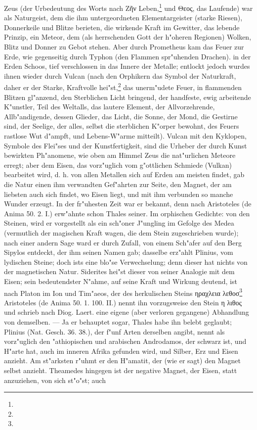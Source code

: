 \documentclass[a4paper, 11pt, oneside, polutonikogreek, german]{article}
\begin{document}
Zeus (der Urbedeutung des Worts nach Ζῆν Leben,\footnote{} und Θεος, das Laufende) war als Naturgeist, dem die ihm untergeordneten Elementargeister (starke Riesen), Donnerkeile und Blitze berieten, die wirkende Kraft im Gewitter, das lebende Prinzip, ein Meteor, dem (als herrschenden Gott der h"oheren Regionen) Wolken, Blitz und Donner zu Gebot stehen. Aber durch Prometheus kam das Feuer zur Erde, wie gegenseitig durch Typhon (den Flammen spr"uhenden Drachen). in der Erden Schoos, tief verschlossen in das Innere der Metalle; entlockt jedoch wurdes ihnen wieder durch Vulcan (nach den Orphikern das Symbol der Naturkraft, daher er der Starke, Kraftvolle hei"st,\footnote{} das unerm"udete Feuer, in flammenden Blitzen gl"anzend, den Sterblichen Licht bringend, der handfeste, ewig arbeitende K"unstler, Teil des Weltalls, das lautere Element, der Allvorzehrende, Allb"andigende, dessen Glieder, das Licht, die Sonne, der Mond, die Gestirne sind, der Seelige, der alles, selbst die sterblichen K"orper bewohnt, des Feuers rastlose Wut d"ampft, und Lebens-W"arme mitteilt). Vulcan mit den Kyklopen, Symbole des Flei"ses und der Kunstfertigkeit, sind die Urheber der durch Kunst bewirkten Ph"anomene, wie oben am Himmel Zeus die nat"urlichen Meteore erregt; aber dem Eisen, das vorz"uglich vom g"ottlichen Schmiede (Vulkan) bearbeitet wird, d. h. von allen Metallen sich auf Erden am meisten findet, gab die Natur einen ihm verwandten Gef"ahrten zur Seite, den Magnet, der am liebsten auch sich findet, wo Eisen liegt, und mit ihm verbunden so manche Wunder erzeugt. In der fr"uhesten Zeit war er bekannt, denn nach Aristoteles (de Anima 50. 2. I.) erw"ahnte schon Thales seiner. Im orphischen Gedichte: von den Steinen, wird er vorgestellt als ein sch"oner J"ungling im Gefolge des Medea (vermutlich der magischen Kraft wagen, die dem Stein zugeschrieben wurde); nach einer andern Sage ward er durch Zufall, von einem Sch"afer auf den Berg Sipylos entdeckt, der ihm seinen Namen gab; dasselbe erz"ahlt Plinius, vom lydischen Steine; doch ists eine blo"se Verwechselung; denn dieser hat nichts von der magnetischen Natur. Siderites hei"st dieser von seiner Analogie mit dem Eisen; sein bedeutendster N"ahme, auf seine Kraft und Wirkung deutend, ist nach Platon im Ion und Tim"aeos, der des herkulischen Steins ηραχλεια λεθοσ\footnote{} Aristoteles (de Anima 50. 1. 100. II.) nennt ihn vorzugsweise den Stein η λιθος und schrieb nach Diog. Laert. eine eigene (aber verloren gegangene) Abhandlung von demselben. --- Ja er behauptet sogar, Thales habe ihn belebt geglaubt; Plinius (Nat. Gesch. 36. 38.), der f"unf Arten derselben angibt, nennt als vorz"uglich den "athiopischen und arabischen Androdamos, der schwarz ist, und H"arte hat, auch im inneren Afrika gefunden wird, und Silber, Erz und Eisen anzieht. Am st"arksten r"uhmt er den H"amatit, der (wie er sagt) den Magnet selbst anzieht. Theamedes hingegen ist der negative Magnet, der Eisen, statt anzuziehen, von sich st"o"st; auch 
\end{document}
